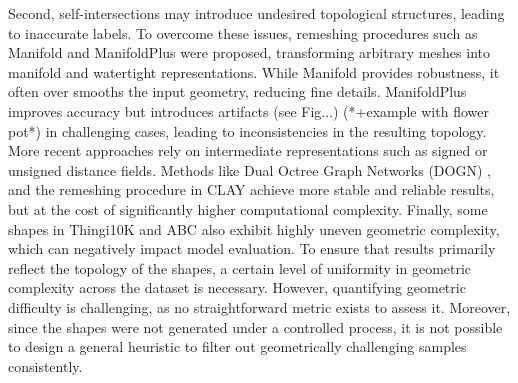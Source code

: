 Second, self-intersections may introduce undesired topological structures, leading to inaccurate labels. To overcome these issues, remeshing procedures such as Manifold \cite{manifold} and ManifoldPlus \cite{manifoldplus} were proposed, transforming arbitrary meshes into manifold and watertight representations. While Manifold provides robustness, it often over smooths the input geometry, reducing fine details. ManifoldPlus improves accuracy but introduces artifacts (see Fig...) (*+example with flower pot*) in challenging cases, leading to inconsistencies in the resulting topology. More recent approaches rely on intermediate representations such as signed or unsigned distance fields. Methods like Dual Octree Graph Networks (DOGN) \cite{dogn}, and the remeshing procedure in CLAY \cite{clay} achieve more stable and reliable results, but at the cost of significantly higher computational complexity. Finally, some shapes in Thingi10K and ABC also exhibit highly uneven geometric complexity, which can negatively impact model evaluation. To ensure that results primarily reflect the topology of the shapes, a certain level of uniformity in geometric complexity across the dataset is necessary. However, quantifying geometric difficulty is challenging, as no straightforward metric exists to assess it. Moreover, since the shapes were not generated under a controlled process, it is not possible to design a general heuristic to filter out geometrically challenging samples consistently.



